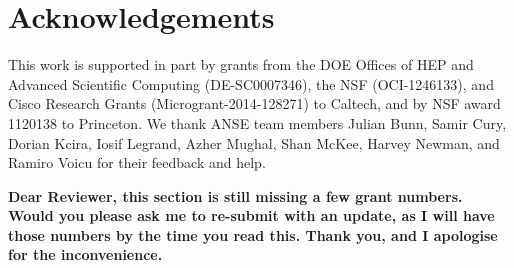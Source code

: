 \section{Acknowledgements}

This work is supported in part by grants from the DOE Offices of HEP and Advanced Scientific Computing (DE-SC0007346), the NSF (OCI-1246133), and Cisco Research Grants (Microgrant-2014-128271) to Caltech, and by NSF award 1120138 to Princeton. We thank ANSE team members Julian Bunn, Samir Cury, Dorian Kcira, Iosif Legrand, Azher Mughal, Shan McKee, Harvey Newman, and Ramiro Voicu for their feedback and help.

{\bf Dear Reviewer, this section is still missing a few grant numbers. Would you please ask me to re-submit with an update, as I will have those numbers by the time you read this. Thank you, and I apologise for the inconvenience.}